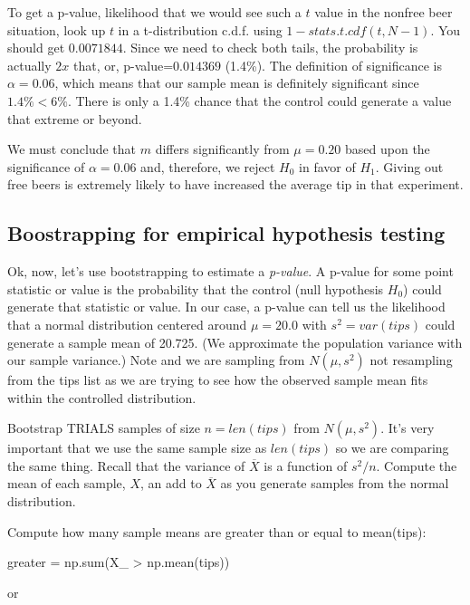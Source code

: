 \begin{fullwidth}
\step  To get a p-value, likelihood that we would see such a $t$ value in the nonfree beer situation, look up $t$ in a t-distribution c.d.f. using $1-stats.t.cdf(t,N-1)$. You should get $0.0071844$. Since we need to check both tails, the probability is actually $2x$ that, or, p-value=$0.014369$ (1.4\%). The definition of significance is $\alpha = 0.06$, which means that our sample mean is definitely significant since $1.4\% < 6\%$.  There is only a 1.4\% chance that the control could generate a value that extreme or beyond.

We must conclude that $m$ differs significantly from $\mu = 0.20$ based upon the significance of $\alpha=0.06$ and, therefore, we reject $H_0$ in favor of $H_1$.  Giving out free beers is extremely likely to have increased the average tip in that experiment.

\subsection{Boostrapping for empirical hypothesis testing}

\setcounter{problem}{0}

Ok, now, let's use bootstrapping to estimate a {\em p-value}. A p-value for some point statistic or value is the probability that the control (null hypothesis $H_0$) could generate that statistic or value. In our case, a p-value can tell us the likelihood that a normal distribution centered around $\mu=20.0$ with $s^2=var(tips)$ could generate a sample mean of 20.725. (We approximate the population variance with our sample variance.) Note and we are sampling from $N(\mu,s^2)$ not resampling from the tips list as we are trying to see how the observed sample mean fits within the controlled distribution.

\step Bootstrap TRIALS samples of size $n=len(tips)$ from $N(\mu, s^2)$. It's very important that we use the same sample size as $len(tips)$ so we are comparing the same thing. Recall that the variance of $\overline{X}$ is a function of $s^2/n$. Compute the mean of each sample, $X$, an add to $\overline{X}$ as you generate samples from the normal distribution.

\step Compute how many sample means are greater than or equal to mean(tips):

\begin{pyverbatim}
greater = np.sum(X_ > np.mean(tips))
\end{pyverbatim}

or


\end{fullwidth}
